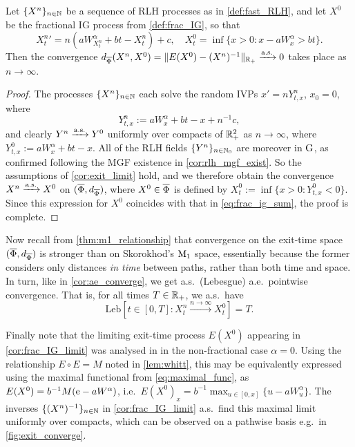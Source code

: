 \begin{corollary}\label{cor:frac_IG_limit}
    Let $\{X^n\}_{n\in\mathbb{N}}$ be a sequence of RLH processes as in \autoref{def:fast_RLH}, and let $X^0$ be the fractional IG process from \autoref{def:frac_IG}, so that
    \begin{equation}\label{eq:frac_ig_sum}
        {X^n_t}' = n\left( a W^\alpha_{X^n_t} + b t - X^n_t\right) + c,\quad X^0_t =\inf\big\{x>0 : x - a W^\alpha_x > bt\big\}.
    \end{equation}
    Then the convergence $d_{\overline{\Phi}}(X^n,X^0)=\Vert E(X^0) - (X^n)^{-1}\Vert_{\mathbb{R}_+}\xrightarrow{\mathrm{a.s.}} 0$ takes place as $n\to\infty$.
\end{corollary}
\begin{proof}
    The processes $\{X^n\}_{n\in\mathbb{N}}$ each solve the random IVPs $x'=n Y^n_{t,x}$, $x_0=0$, where
    \begin{equation}
        Y^n_{t,x} := a W^\alpha_x + b t - x + n^{-1}c,
    \end{equation}
    and clearly $Y^n\xrightarrow{\mathrm{a.s.}} Y^0$ uniformly over compacts of $\mathbb{R}_+^2$ as $n\to\infty$, where $Y^0_{t,x}:=a W^\alpha_x + b t - x$. All of the RLH fields $\{Y^n\}_{n\in\mathbb{N}_0}$ are moreover in $\mathrm{G}$, as confirmed following the MGF existence in \autoref{cor:rlh_mgf_exist}. So the assumptions of \autoref{cor:exit_limit} hold, and we therefore obtain the convergence $X^n \xrightarrow{\mathrm{a.s.}} X^0$ on $(\overline{\Phi},d_{\overline{\Phi}})$, where $X^0\in\overline{\Phi}$ is defined by $X^0_t:=\inf\{x>0:Y^0_{t,x}<0\}$. Since this expression for $X^0$ coincides with that in \autoref{eq:frac_ig_sum}, the proof is complete.
\end{proof}

Now recall from \autoref{thm:m1_relationship} that convergence on the exit-time space $(\overline{\Phi},d_{\overline{\Phi}})$ is stronger than on Skorokhod's $\mathrm{M}_1$ space, essentially because the former considers only distances \emph{in time} between paths, rather than both time and space. In turn, like in \autoref{cor:ae_converge}, we get a.s.~(Lebesgue) a.e.~pointwise convergence. That is, for all times $T\in\mathbb{R}_+$, we a.s.~have
\begin{equation}
    \mathrm{Leb}\left[t\in[0,T]: X^n_t\xrightarrow{n\to\infty}X^0_t\right]=T.
\end{equation}

Finally note that the limiting exit-time process $E(X^0)$ appearing in \autoref{cor:frac_IG_limit} was analysed in \cite{vellaisamy_2018} in the non-fractional case $\alpha=0$. Using the relationship $E\circ E=M$ noted in \autoref{lem:whitt}, this may be equivalently expressed using the maximal functional from \autoref{eq:maximal_func}, as $E(X^0)=b^{-1}M(\mathrm{e}-aW^\alpha)$, i.e.~$E(X^0)_x=b^{-1}\max_{u\in[0,x]}\{u-aW^\alpha_u\}$. The inverses $\{(X^n)^{-1}\}_{n\in\mathbb{N}}$ in \autoref{cor:frac_IG_limit} a.s.~find this maximal limit uniformly over compacts, which can be observed on a pathwise basis e.g.~in \autoref{fig:exit_converge}.

